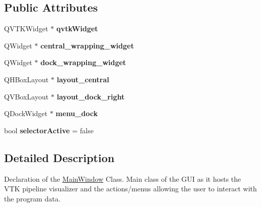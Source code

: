 \subsection*{Public Attributes}
\begin{DoxyCompactItemize}
\item 
Q\+V\+T\+K\+Widget $\ast$ {\bfseries qvtk\+Widget}\hypertarget{class_main_window_a987c16edfdf86679ea180e3c1af08e07}{}\label{class_main_window_a987c16edfdf86679ea180e3c1af08e07}

\item 
Q\+Widget $\ast$ {\bfseries central\+\_\+wrapping\+\_\+widget}\hypertarget{class_main_window_a607a0ae3a2d1785d11b65560e125f835}{}\label{class_main_window_a607a0ae3a2d1785d11b65560e125f835}

\item 
Q\+Widget $\ast$ {\bfseries dock\+\_\+wrapping\+\_\+widget}\hypertarget{class_main_window_a867cba72789a67607c2029391cb29b6b}{}\label{class_main_window_a867cba72789a67607c2029391cb29b6b}

\item 
Q\+H\+Box\+Layout $\ast$ {\bfseries layout\+\_\+central}\hypertarget{class_main_window_a6c85c0aeb8404eb5f0bb5b9a8a640d0f}{}\label{class_main_window_a6c85c0aeb8404eb5f0bb5b9a8a640d0f}

\item 
Q\+V\+Box\+Layout $\ast$ {\bfseries layout\+\_\+dock\+\_\+right}\hypertarget{class_main_window_af64854e3c836aa6ad4e8d85e553dd58e}{}\label{class_main_window_af64854e3c836aa6ad4e8d85e553dd58e}

\item 
Q\+Dock\+Widget $\ast$ {\bfseries menu\+\_\+dock}\hypertarget{class_main_window_a2e7fc292c9a123fd522a363844e39fa0}{}\label{class_main_window_a2e7fc292c9a123fd522a363844e39fa0}

\item 
bool {\bfseries selector\+Active} = false\hypertarget{class_main_window_a330930fdef1adf6db5446c93e203c9b2}{}\label{class_main_window_a330930fdef1adf6db5446c93e203c9b2}

\end{DoxyCompactItemize}


\subsection{Detailed Description}
Declaration of the \hyperlink{class_main_window}{Main\+Window} Class. Main class of the G\+UI as it hosts the V\+TK pipeline visualizer and the actions/menus allowing the user to interact with the program data. 

